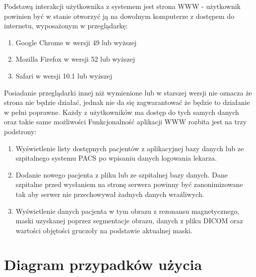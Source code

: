 \documentclass[a4paper,11pt,twoside]{report}
\theoremstyle{definition}
\begin{document}
Podstawą interakcji użytkownika z systemem jest strona WWW - użytkownik powinien
być w stanie otworzyć ją na dowolnym komputerze z dostępem do internetu, wyposażonym
w przeglądarkę:
\begin {enumerate}
\item Google Chrome w wersji 49 lub wyższej
\item Mozilla Firefox w wersji 52 lub wyższej
\item Safari w wersji 10.1 lub wyższej
\end {enumerate}
Posiadanie przeglądarki innej niż wymienione lub w starszej wersji nie oznacza że strona nie będzie działać, jednak nie da się zagwarantować że będzie to działanie w pełni poprawne.
Każdy z użytkowników ma dostęp do tych samych danych oraz takie same możliwości
Funkcjonalność aplikacji WWW rozbita jest na trzy podstrony:
\begin {enumerate}
\item Wyświetlenie listy dostępnych pacjentów z aplikacyjnej bazy danych lub ze szpitalnego systemu PACS po wpisaniu danych logowania lekarza.
\item Dodanie nowego pacjenta z pliku lub ze szpitalnej bazy danych. Dane szpitalne przed wysłaniem na stronę serwera powinny być zanonimizowane tak aby serwer nie przechowywał żadnych danych wrażliwych.
\item Wyświetlenie danych pacjenta w tym obrazu z rezonansu magnetycznego, maski uzyskanej poprzez segmentacje obrazu, danych z pliku DICOM oraz wartości objętości gruczoły na podstawie aktualnej maski.
\end {enumerate}

\section{Diagram przypadków użycia}
\end{document}
